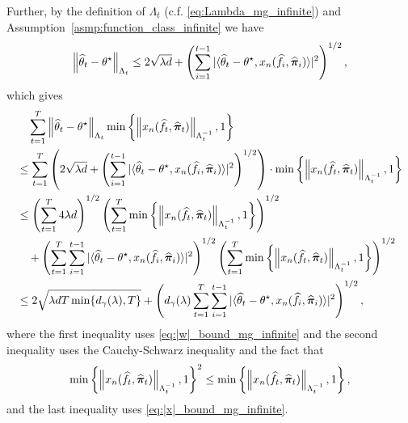 Further, by the definition of $\Lambda_t$ (c.f. \eqref{eq:Lambda_mg_infinite}) and Assumption~\ref{asmp:function_class_infinite} we have
\begin{align}\label{eq:|w|_bound_mg_infinite}
\left\| \widehat{\theta}_t-\theta^\star \right\|_{\Lambda_t}\leq 2\sqrt{\lambda d}+\left(\sum_{i=1}^{t-1} |\langle \widehat{\theta}_t-\theta^\star,x_n(\widehat{f}_i,\widehat{{\bm{\pi}}}_i)\rangle|^2\right)^{1/2},
\end{align}
which gives
\begin{align}\label{eq:intermediate1_infinite}
&\quad\sum_{t=1}^T \left\| \widehat{\theta}_t-\theta^\star \right\|_{\Lambda_t}\min\left\{ \left\| x_n(\widehat{f}_t,\widehat{{\bm{\pi}}}_t) \right\|_{\Lambda_{t}^{-1}},1\right\}\notag\\
&\leq \sum_{t=1}^T\left(2\sqrt{\lambda d} +\left(\sum_{i=1}^{t-1} |\langle \widehat{\theta}_t-\theta^\star,x_n(\widehat{f}_i,\widehat{{\bm{\pi}}}_i)\rangle|^2\right)^{1/2}\right)\cdot\min\left\{ \left\| x_n(\widehat{f}_t,\widehat{{\bm{\pi}}}_t) \right\|_{\Lambda_{t}^{-1}},1\right\}\notag\\
&\leq \left(\sum_{t=1}^T 4\lambda d\right)^{1/2}
\left(\sum_{t=1}^T \min\left\{ \left\| x_n(\widehat{f}_t,\widehat{{\bm{\pi}}}_t) \right\|_{\Lambda_{t}^{-1}},1\right\}\right)^{1/2}\notag\\
&\quad + \left(\sum_{t=1}^T \sum_{i=1}^{t-1} |\langle \widehat{\theta}_t-\theta^\star,x_n(\widehat{f}_i,\widehat{{\bm{\pi}}}_i)\rangle|^2\right)^{1/2}\left(\sum_{t=1}^T \min\left\{ \left\| x_n(\widehat{f}_t,\widehat{{\bm{\pi}}}_t) \right\|_{\Lambda_{t}^{-1}},1\right\}\right)^{1/2}\notag\\
&\leq 2\sqrt{\lambda dT \min\{d_\gamma(\lambda),T\}} + \left(d_\gamma(\lambda)\sum_{t=1}^T \sum_{i=1}^{t-1} |\langle \widehat{\theta}_t-\theta^\star,x_n(\widehat{f}_i,\widehat{{\bm{\pi}}}_i)\rangle|^2\right)^{1/2},
\end{align}
where the first inequality uses \eqref{eq:|w|_bound_mg_infinite} and the second inequality uses the Cauchy-Schwarz inequality and the fact that 
$$\min\left\{ \left\| x_n(\widehat{f}_t,\widehat{{\bm{\pi}}}_t) \right\|_{\Lambda_{t}^{-1}},1\right\}^2\leq \min\left\{ \left\| x_n(\widehat{f}_t,\widehat{{\bm{\pi}}}_t) \right\|_{\Lambda_{t}^{-1}},1\right\},$$
and the last inequality uses \eqref{eq:|x|_bound_mg_infinite}.

